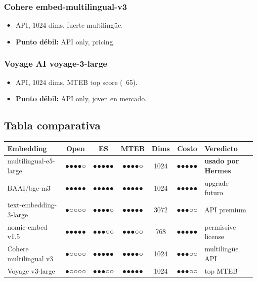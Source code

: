 \documentclass[11pt,a4paper]{article}
\newcommand{\scale}[1]{\textbf{\color{sotagreen}#1}}
\begin{document}
\subsubsection{Cohere embed-multilingual-v3}
\begin{itemize}[leftmargin=*,itemsep=0pt]
\item API, 1024 dims, fuerte multilingüe.
\item \textbf{Punto débil:} API only, pricing.
\end{itemize}

\subsubsection{Voyage AI voyage-3-large}
\begin{itemize}[leftmargin=*,itemsep=0pt]
\item API, 1024 dims, MTEB top score (~65).
\item \textbf{Punto débil:} API only, joven en mercado.
\end{itemize}

\subsection{Tabla comparativa}

\begin{center}
\begin{tabularx}{0.95\textwidth}{|l|c|c|c|c|c|X|}
\hline
\rowcolor{sotared}\color{white}\textbf{Embedding} & \color{white}\textbf{Open} & \color{white}\textbf{ES} & \color{white}\textbf{MTEB} & \color{white}\textbf{Dims} & \color{white}\textbf{Costo} & \color{white}\textbf{Veredicto}\\
\hline
\rowcolor{hermespos}multilingual-e5-large & ●●●●○ & \scale{●●●●●} & ●●●●○ & 1024 & \scale{●●●●●} & \textbf{usado por Hermes}\\
BAAI/bge-m3 & \scale{●●●●●} & \scale{●●●●●} & \scale{●●●●●} & 1024 & \scale{●●●●●} & upgrade futuro\\
text-embedding-3-large & ●○○○○ & ●●●●○ & \scale{●●●●●} & 3072 & ●●●○○ & API premium\\
nomic-embed v1.5 & \scale{●●●●●} & ●●●○○ & ●●●○○ & 768 & \scale{●●●●●} & permissive license\\
Cohere multilingual v3 & ●○○○○ & \scale{●●●●●} & ●●●●○ & 1024 & ●●●○○ & multilingüe API\\
Voyage v3-large & ●○○○○ & ●●●○○ & \scale{●●●●●} & 1024 & ●●●○○ & top MTEB\\
\hline
\end{tabularx}
\end{center}
\end{document}
